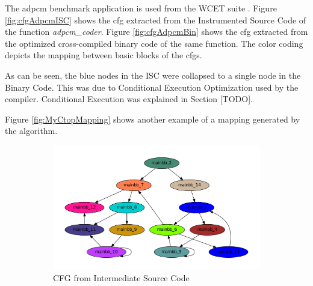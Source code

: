 The adpcm benchmark application is used from the WCET suite \cite{WCET}. Figure \ref{fig:cfgAdpcmISC} shows the \gls{cfg} extracted from the Instrumented Source Code of the function \emph{adpcm\_coder}. Figure \ref{fig:cfgAdpcmBin} shows the \gls{cfg} extracted from the optimized cross-compiled binary code of the same function. The color coding depicts the mapping between basic blocks of the \gls{cfg}s.

As can be seen, the blue nodes in the ISC were collapsed to a single node in the Binary Code. This was due to Conditional Execution Optimization used by the compiler. Conditional Execution was explained in Section [TODO].

Figure \ref{fig:MyCtopMapping} shows another example of a mapping generated by the algorithm.

\begin{figure}[h!]
\centering
\begin{subfigure}[t]{.5\textwidth}
\captionsetup{margin=10pt}
\includegraphics[width=\textwidth]{figures/isc_my_ctop_IR_main.pdf}
\caption{CFG from Intermediate Source Code}
\label{fig:cfgMyCtopISC}
\end{subfigure}%
~
\begin{subfigure}[t]{.5\textwidth}
\captionsetup{margin=10pt}

\end{subfigure}
\end{figure}
